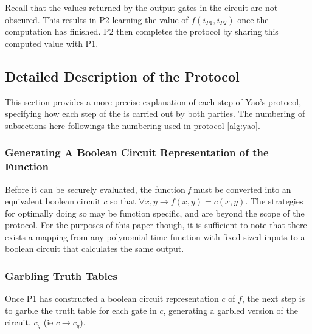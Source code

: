 Recall that the values returned by the output gates in the circuit are not obscured. This results in \ac{P2} learning the value of $f(i_{P1}, i_{P2})$ once the computation has finished.  \ac{P2} then completes the protocol by sharing this computed value with \ac{P1}.


\subsection{Detailed Description of the Protocol}

This section provides a more precise explanation of each step of Yao's protocol, specifying how each step of the is carried out by both parties.  The numbering of subsections here followings the numbering used in protocol \ref{alg:yao}.


\subsubsection{Generating A Boolean Circuit Representation of the Function}

Before it can be securely evaluated, the function \emph{f} must be converted into an equivalent boolean circuit $c$ so that $\forall x, y \rightarrow f(x, y) = c(x, y)$. The strategies for optimally doing so may be function specific, and are beyond the scope of the protocol.  For the purposes of this paper though, it is sufficient to note that there exists a mapping from any polynomial time function with fixed sized inputs to a boolean circuit that calculates the same output\cite{goldreich1987play}.


\subsubsection{Garbling Truth Tables}

Once \ac{P1} has constructed a boolean circuit representation $c$ of $f$, the next step is to garble the truth table for each gate in $c$, generating a garbled version of the circuit, $c_g$ (ie $c \to c_g$).

